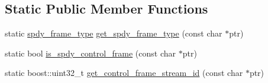 \subsection*{Static Public Member Functions}
\begin{DoxyCompactItemize}
\item 
static \hyperlink{namespacepion_1_1spdy_ae477ffb44271bac96119422b364435ce}{spdy\-\_\-frame\-\_\-type} \hyperlink{classpion_1_1spdy_1_1parser_afa6e6079f12d6adc17688b38bc0727dd}{get\-\_\-spdy\-\_\-frame\-\_\-type} (const char $\ast$ptr)
\item 
static bool \hyperlink{classpion_1_1spdy_1_1parser_a9d162f5bb587fe627f678a9ab19dd712}{is\-\_\-spdy\-\_\-control\-\_\-frame} (const char $\ast$ptr)
\item 
static boost\-::uint32\-\_\-t \hyperlink{classpion_1_1spdy_1_1parser_a472c57e8a77ee5ad056ef11fe5aad50e}{get\-\_\-control\-\_\-frame\-\_\-stream\-\_\-id} (const char $\ast$ptr)
\end{DoxyCompactItemize}
